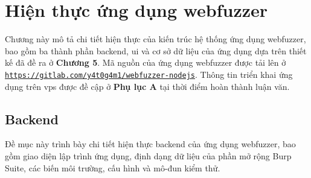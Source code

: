 \chapter{Hiện thực ứng dụng webfuzzer}
Chương này mô tả chi tiết hiện thực của kiến trúc hệ thống ứng dụng webfuzzer, bao gồm ba thành phần backend, \acrshort{ui} và cơ sở dữ liệu của ứng dụng dựa trên thiết kế đã đề ra ở \textbf{Chương 5}. Mã nguồn của ứng dụng webfuzzer được tải lên ở \href{https://gitlab.com/y4t0g4m1/webfuzzer-nodejs}{\texttt{https://gitlab.com/y4t0g4m1/webfuzzer-nodejs}}. Thông tin triển khai ứng dụng trên \acrshort{vps} được đề cập ở \textbf{Phụ lục A} tại thời điểm hoàn thành luận văn.
\section{Backend}
Đề mục này trình bày chi tiết hiện thực backend của ứng dụng webfuzzer, bao gồm giao diện lập trình ứng dụng, định dạng dữ liệu của phần mở rộng Burp Suite, các biến môi trường, cấu hình và mô-đun kiểm thử.
